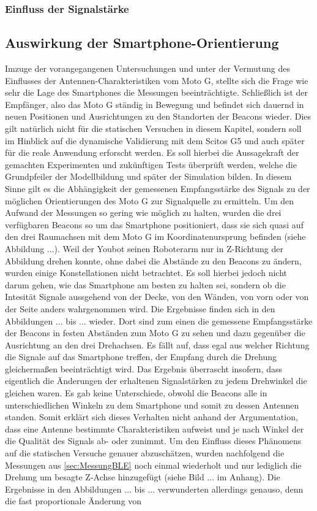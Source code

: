 \subsubsection{Einfluss der Signalstärke} 
\subsection{Auswirkung der Smartphone-Orientierung}
Imzuge der vorangegangenen Untersuchungen und unter der Vermutung des Einflusses der Antennen-Charakteristiken vom Moto G, stellte sich die Frage wie sehr die Lage des Smartphones die Messungen beeinträchtigte. Schließlich ist der Empfänger, also das Moto G ständig in Bewegung und befindet sich dauernd in neuen Positionen und Ausrichtungen zu den Standorten der Beacons wieder. Dies gilt natürlich nicht für die statischen Versuchen in diesem Kapitel, sondern soll im Hinblick auf die dynamische Validierung mit dem Scitos G5 und auch später für die reale Anwendung erforscht werden. Es soll hierbei die Aussagekraft der gemachten Experimenten und zukünftigen Tests überprüft werden, welche die Grundpfeiler der Modellbildung und später der Simulation bilden. In diesem Sinne gilt es die Abhängigkeit der gemessenen Empfangsstärke des Signals zu der möglichen Orientierungen des Moto G zur Signalquelle zu ermitteln. Um den Aufwand der Messungen so gering wie möglich zu halten, wurden die drei verfügbaren Beacons so um das Smartphone positioniert, dass sie sich quasi auf den drei Raumachsen mit dem Moto G im Koordinatenursprung befinden (siehe Abbildung ...). Weil der Youbot seinen Roboterarm nur in Z-Richtung der Abbildung drehen konnte, ohne dabei die Abstände zu den Beacons zu ändern, wurden einige Konstellationen nicht betrachtet. Es soll hierbei jedoch nicht darum gehen, wie das Smartphone am besten zu halten sei, sondern ob die Intesität Signale aussgehend von der Decke, von den Wänden, von vorn oder von der Seite anders wahrgenommen wird. Die Ergebnisse finden sich in den Abbildungen ... bis ... wieder. Dort sind zum einen die gemessene Empfangsstärke der Beacons in festen Abständen zum Moto G zu sehen und dazu gegenüber die Ausrichtung an den drei Drehachsen. Es fällt auf, dass egal aus welcher Richtung die Signale auf das Smartphone treffen, der Empfang durch die Drehung gleichermaßen beeinträchtigt wird. Das Ergebnis überrascht insofern, dass eigentlich die Änderungen der erhaltenen Signalstärken zu jedem Drehwinkel die gleichen waren. Es gab keine Unterschiede, obwohl die Beacons alle in unterschiedlichen Winkeln zu dem Smartphone und somit zu dessen Antennen standen. Somit erklärt sich dieses Verhalten nicht anhand der Argumentation, dass eine Antenne bestimmte Charakteristiken aufweist und je nach Winkel der die Qualität des Signals ab- oder zunimmt. Um den Einfluss dieses Phänomens auf die statischen Versuche genauer abzuschätzen, wurden nachfolgend die Messungen aus \ref{sec:MessungBLE} noch einmal wiederholt und nur lediglich die Drehung um besagte Z-Achse hinzugefügt (siehe Bild ... im Anhang). Die Ergebnisse in den Abbildungen ... bis ... verwunderten allerdings genauso, denn die fast proportionale Änderung von 